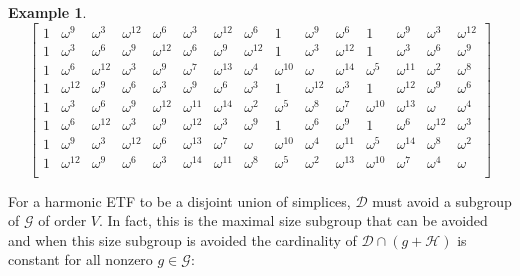 \documentclass[3p,11pt]{elsarticle}
\newcommand{\bbC}{\mathbb{C}}
\newcommand{\bfx}{\mathbf{x}}
\newcommand{\calD}{\mathcal{D}}
\newcommand{\calG}{\mathcal{G}}
\newcommand{\calH}{\mathcal{H}}
\theoremstyle{definition}
\newtheorem{example}[theorem]{Example}
\begin{document}
\begin{example}
\begin{equation}
    \left[\begin{array}{ccccc|ccccc|ccccc}
    1 & \omega^9 & \omega^3 & \omega^{12} & \omega^6 & \omega^3 & \omega^{12} & \omega^6 & 1 & \omega^9 & \omega^6 & 1 & \omega^9 & \omega^3 & \omega^{12} \\
    1 & \omega^3 & \omega^6 & \omega^{9} & \omega^{12} & \omega^6 & \omega^{9} & \omega^{12} & 1 & \omega^3 & \omega^{12} & 1 & \omega^3 & \omega^6 & \omega^{9} \\
    1 & \omega^6 & \omega^{12} & \omega^{3} & \omega^{9} & \omega^7 & \omega^{13} & \omega^{4} & \omega^{10} & \omega & \omega^{14} & \omega^5 & \omega^{11} & \omega^2 & \omega^{8} \\
    1 & \omega^{12} & \omega^9 & \omega^{6} & \omega^{3} & \omega^9 & \omega^{6} & \omega^{3} & 1 & \omega^{12} & \omega^{3} & 1 & \omega^{12} & \omega^9 & \omega^{6} \\
    1 & \omega^{3} & \omega^{6} & \omega^{9} & \omega^{12} & \omega^{11} & \omega^{14} & \omega^{2} & \omega^5 & \omega^8 & \omega^{7} & \omega^{10} & \omega^{13} & \omega & \omega^{4} \\
    1 & \omega^{6} & \omega^{12} & \omega^{3} & \omega^{9} & \omega^{12} & \omega^{3} & \omega^{9} & 1 & \omega^6 & \omega^{9} & 1 & \omega^6 & \omega^{12} & \omega^{3} \\
    1 & \omega^9 & \omega^3 & \omega^{12} & \omega^{6} & \omega^{13} & \omega^{7} & \omega & \omega^{10} & \omega^4 & \omega^{11} & \omega^5 & \omega^{14} & \omega^8 & \omega^{2} \\
    1 & \omega^{12} & \omega^9 & \omega^{6} & \omega^{3} & \omega^{14} & \omega^{11} & \omega^{8} & \omega^5 & \omega^2 & \omega^{13} & \omega^{10} & \omega^7 & \omega^4 & \omega \\
    \end{array}\right]
\end{equation}

\end{example}
For a harmonic ETF to be a disjoint union of simplices, $\calD$ must avoid a subgroup of $\calG$ of order $V.$ In fact, this is the maximal size subgroup that can be avoided and when this size subgroup is avoided the cardinality of $\calD\cap(g+\calH)$ is constant for all nonzero $g\in\calG$:

\end{document}
